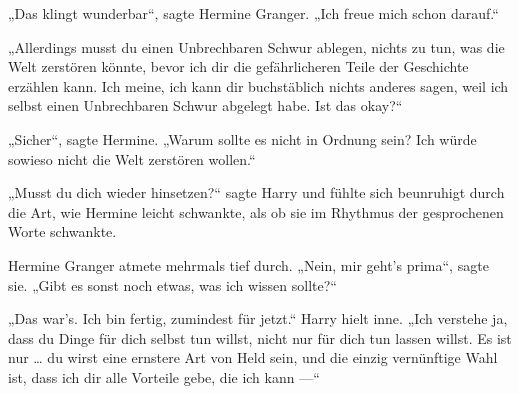„Das klingt wunderbar“, sagte Hermine Granger.
„Ich freue mich schon darauf.“

„Allerdings musst du einen Unbrechbaren Schwur ablegen, nichts zu tun, was die Welt zerstören könnte, bevor ich dir die gefährlicheren Teile der Geschichte erzählen kann. Ich meine, ich kann dir buchstäblich nichts anderes sagen, weil ich selbst einen Unbrechbaren Schwur abgelegt habe. Ist das okay?“

„Sicher“, sagte Hermine.
„Warum sollte es nicht in Ordnung sein? Ich würde sowieso nicht die Welt zerstören wollen.“

„Musst du dich wieder hinsetzen?“ sagte Harry und fühlte sich beunruhigt durch die Art, wie Hermine leicht schwankte, als ob sie im Rhythmus der gesprochenen Worte schwankte.

Hermine Granger atmete mehrmals tief durch.
„Nein, mir geht’s prima“, sagte sie.
„Gibt es sonst noch etwas, was ich wissen sollte?“

„Das war’s. Ich bin fertig, zumindest für jetzt.“
Harry hielt inne.
„Ich verstehe ja, dass du Dinge für dich selbst tun willst, nicht nur für dich tun lassen willst. Es ist nur … du wirst eine ernstere Art von Held sein, und die einzig vernünftige Wahl ist, dass ich dir alle Vorteile gebe, die ich kann —“

